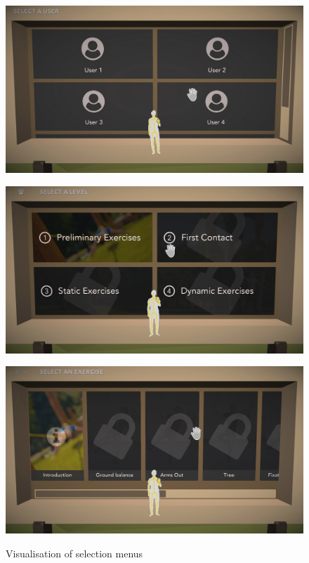 \begin{figure}[htb]
	\centering
	\begin{minipage}[t]{0.32\linewidth}
		\centering
		\includegraphics[width=1\linewidth]{Pictures/5_Workflow/5_UserMenu}
		\label{fig:5_3_user_menu}
	\end{minipage}
	\hfill
	\begin{minipage}[t]{0.32\linewidth}
		\centering
		\includegraphics[width=1\linewidth]{Pictures/5_Workflow/6_LevelMenu}
		\label{fig:5_3_level_menu}
	\end{minipage}
	\hfill
	\begin{minipage}[t]{0.32\linewidth}
		\centering
		\includegraphics[width=1\linewidth]{Pictures/5_Workflow/7_1_ExerciseMenu}
		\label{fig:5_3_exercise_menu}
	\end{minipage}
	\caption{Visualisation of selection menus}%
	\label{fig:5_3_selection_menus}
\end{figure}

